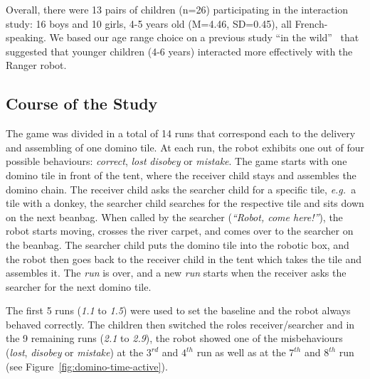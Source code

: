 \documentclass{sig-alternate}
\newcommand{\eg}{{\textit{e.g.~}}}
\begin{document}

Overall, there were 13 pairs of children (n=26) participating in the interaction
study: 16 boys and 10 girls, 4-5 years old (M=4.46, SD=0.45), all
French-speaking. We based our age range choice on a previous study ``in the
wild''~\cite{fink2014which} that suggested that younger children (4-6 years)
interacted more effectively with the Ranger robot.



\subsection{Course of the Study}

The game was divided in a total of 14 runs that correspond each to the delivery
and assembling of one domino tile. At each run, the robot exhibits one out of
four possible behaviours: \emph{correct}, \emph{lost} \emph{disobey} or
\emph{mistake}.  The game starts with one domino tile in front of the tent,
where the receiver child stays and assembles the domino chain. The receiver
child asks the searcher child for a specific tile, \eg a tile with a donkey, the
searcher child searches for the respective tile and sits down on the next
beanbag. When called by the searcher (\textit{``Robot, come here!''}), the robot
starts moving, crosses the river carpet, and comes over to the searcher on the
beanbag. The searcher child puts the domino tile into the robotic box, and the
robot then goes back to the receiver child in the tent which takes the tile and
assembles it. The \emph{run} is over, and a new \emph{run} starts when the
receiver asks the searcher for the next domino tile.

The first 5 runs (\emph{1.1} to \emph{1.5}) were used to set
the baseline and the robot always behaved correctly. The children then switched
the roles receiver/searcher and in the 9 remaining runs (\emph{2.1} to
\emph{2.9}), the robot showed one of the misbehaviours (\emph{lost},
\emph{disobey} or \emph{mistake}) at the $3^{rd}$ and $4^{th}$ run as well as at
the $7^{th}$ and $8^{th}$ run (see Figure~\ref{fig:domino-time-active}).
\end{document}
